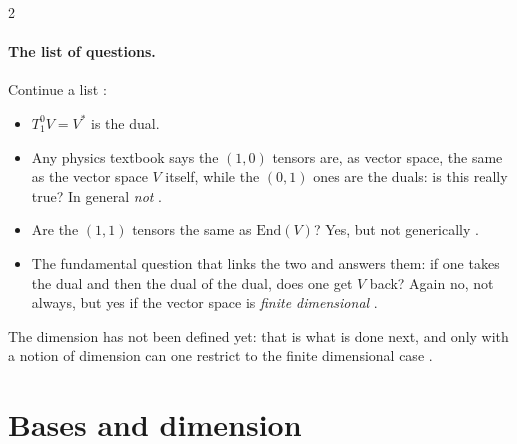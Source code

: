 \begin{paracol}{2}
\paragraph{The list of questions.} Continue a list :
\begin{itemize}
  \item $T^0_1V=V^*$ is the dual.
  \item Any physics textbook says the $(1,0)$ tensors are, as vector space, the same as the vector space $V$ itself, while the $(0,1)$ ones are the duals: is this really true? In general \emph{not} .
  \item Are the $(1,1)$ tensors the same as $\mathrm{End}(V)$? Yes, but not generically .
  \item The fundamental question that links the two and answers them: if one takes the dual and then the dual of the dual, does one get $V$ back? Again no, not always, but yes if the vector space is \emph{finite dimensional}
        .
\end{itemize}
The dimension has not been defined yet: that is what is done next, and only with a notion of dimension can one restrict to the finite dimensional case .

\section{Bases and dimension}\label{sec:te-basis}


\end{paracol}
